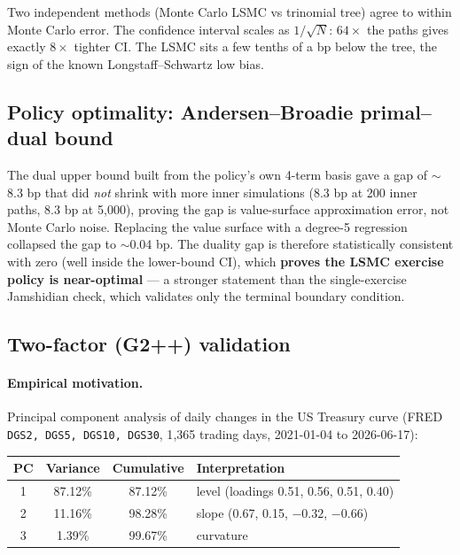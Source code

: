 \documentclass[11pt]{article}
\begin{document}
\noindent Two independent methods (Monte Carlo LSMC vs trinomial tree) agree to within
Monte Carlo error. The confidence interval scales as $1/\sqrt{N}$: $64\times$ the paths
gives exactly $8\times$ tighter CI. The LSMC sits a few tenths of a bp below the tree,
the sign of the known Longstaff--Schwartz low bias.

\subsection{Policy optimality: Andersen--Broadie primal--dual bound}

The dual upper bound built from the policy's own 4-term basis gave a gap of $\sim$8.3 bp
that did \emph{not} shrink with more inner simulations (8.3 bp at 200 inner paths, 8.3 bp
at 5{,}000), proving the gap is value-surface approximation error, not Monte Carlo noise.
Replacing the value surface with a degree-5 regression collapsed the gap to $\sim$0.04 bp.
The duality gap is therefore statistically consistent with zero (well inside the
lower-bound CI), which \textbf{proves the LSMC exercise policy is near-optimal} --- a
stronger statement than the single-exercise Jamshidian check, which validates only the
terminal boundary condition.

\subsection{Two-factor (G2++) validation}

\paragraph{Empirical motivation.} Principal component analysis of daily changes in the US
Treasury curve (FRED \texttt{DGS2, DGS5, DGS10, DGS30}, 1{,}365 trading days, 2021-01-04
to 2026-06-17):

\begin{center}
\begin{tabular}{cccl}
\toprule
PC & Variance & Cumulative & Interpretation \\
\midrule
1 & 87.12\% & 87.12\% & level (loadings 0.51, 0.56, 0.51, 0.40) \\
2 & 11.16\% & 98.28\% & slope (0.67, 0.15, $-0.32$, $-0.66$) \\
3 & 1.39\%  & 99.67\% & curvature \\
\bottomrule
\end{tabular}
\end{center}
\end{document}
